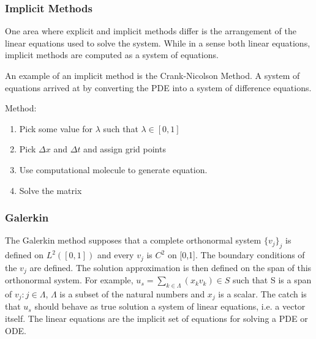 	


\subsubsection{Implicit Methods}

One area where explicit and implicit methods differ is the arrangement of the linear equations used to solve the system.  %
While in a sense both linear equations, implicit methods are computed as a system of equations. %

An example of an implicit method is the Crank-Nicolson Method.  A %
system of equations arrived at by converting the PDE into a system of difference equations.   

Method:  
\begin{enumerate}
\item Pick some value for $\lambda$ such that $\lambda \in [0,1] $
\item Pick $\Delta x$ and $\Delta t$ and assign grid points
\item Use computational molecule to generate equation.
\item Solve the matrix
\end{enumerate}

\subsubsection {Galerkin}
The Galerkin method supposes that a complete orthonormal system $\{v_j\}_j$ is defined on $L^2([0,1])$ and every $v_j$ is $C^2$ on [0,1].  The boundary conditions of the $v_j$ are defined.  %
The solution approximation is then defined on the span of this orthonormal system.  For example,
$u_s = \sum_{k\in \Lambda} (x_k v_k )\in S$ such that S is a span of $v_j : j\in \Lambda$, $\Lambda$ is a subset of the natural numbers and $x_j$ is a scalar.  The catch is that $u_s$ should behave as true solution a system of linear equations, i.e. a vector itself.   The linear equations are %
the implicit set of equations for solving a PDE or ODE.  

